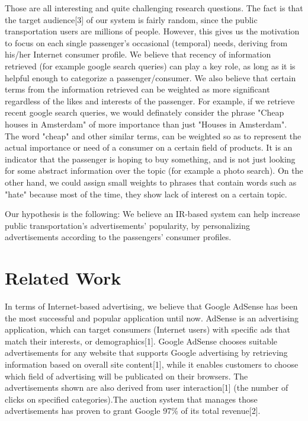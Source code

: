 \documentclass[letterpaper,11pt]{article}
\begin{document}
Those are all interesting and quite challenging research questions. The fact is that the target audience[3] of our system is fairly random, since the public transportation users are millions of people.  However, this gives us the motivation to focus on each single passenger's occasional (temporal) needs, deriving from his/her Internet consumer profile. We believe that recency of information retrieved (for example google search queries) can play a key role, as long as it is helpful enough to categorize a passenger/consumer. We also believe that certain terms from the information retrieved can be weighted as more significant regardless of the likes and interests of the passenger. For example, if we retrieve recent google search queries, we would definately consider the phrase "Cheap houses in Amsterdam" of more importance than just "Houses in Amsterdam". The word "cheap" and other similar terms, can be weighted so as to represent the actual importance or need of a consumer on a certain field of products. It is an indicator that the passenger is hoping to buy something, and is not just looking for some abstract information over the topic (for example a photo search). On the other hand, we could assign small weights to phrases that contain words such as "hate" because most of the time, they show lack of interest on a certain topic.

Our hypothesis is the following: We believe an IR-based system can help increase public transportation's advertisements' popularity, by personalizing advertisements according to the passengers' consumer profiles.

 

\section{Related Work}

In terms of Internet-based advertising, we believe that Google AdSense has been the most successful and popular application until now. AdSense is an advertising application, which can target consumers (Internet users) with specific ads that match their interests, or demographics[1]. Google AdSense chooses suitable advertisements for any website that supports Google advertising by retrieving information based on overall site content[1], while it enables customers to choose which field of advertising will be publicated on their browsers. The advertisements shown are also derived from user interaction[1] (the number of clicks on specified categories).The auction system that manages those advertisements has proven to grant Google 97\% of its total revenue[2].
\end{document}
